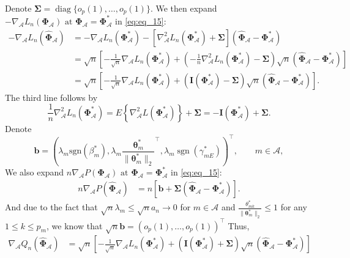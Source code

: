 \documentclass[a4paper,fleqn]{cas-sc}
\newcommand{\sgn}{\operatorname{sgn}}
\newcommand{\ddd}{,\ldots,}
\DeclareMathOperator{\diag}{diag} %
\newcommand{\A}{\mathcal{A}}
\begin{document}
{\normalsize{}Denote $\boldsymbol{\Sigma}=\diag\{o_{p}(1)\ddd o_{p}(1)\}.$
	We then expand $-\nabla_{\A}L_{n}\left(\boldsymbol{\Phi}_{\A}\right)\text{ at }\boldsymbol{\Phi}_{\A}=\boldsymbol{\Phi}_{\A}^{*}$
	in \eqref{eq:eq_15}: 
	\[
	\begin{aligned}-\nabla_{\A}L_{n}\left(\widehat{\boldsymbol{\Phi}}_{\A}\right) & =-\nabla_{\A}L_{n}\left(\boldsymbol{\Phi}_{\A}^{*}\right)-\left[\nabla_{\A}^{2}L_{n}\left(\boldsymbol{\Phi}_{\A}^{*}\right)+\boldsymbol{\Sigma}\right]\left(\widehat{\boldsymbol{\Phi}}_{\A}-\boldsymbol{\Phi}_{\A}^{*}\right)\\
	& =\sqrt{n}\left[-\frac{1}{\sqrt{n}}\nabla_{\A}L_{n}\left(\boldsymbol{\Phi}_{\A}^{*}\right)+\left(-\frac{1}{n}\nabla_{\A}^{2}L_{n}\left(\boldsymbol{\Phi}_{\A}^{*}\right)-\boldsymbol{\Sigma}\right)\sqrt{n}\left(\widehat{\boldsymbol{\Phi}}_{\A}-\boldsymbol{\Phi}_{\A}^{*}\right)\right]\\
	& =\sqrt{n}\left[-\frac{1}{\sqrt{n}}\nabla_{\A}L_{n}\left(\boldsymbol{\Phi}_{\A}^{*}\right)+\left(\mathbf{I}\left(\boldsymbol{\Phi}_{\A}^{*}\right)-\boldsymbol{\Sigma}\right)\sqrt{n}\left(\widehat{\boldsymbol{\Phi}}_{\A}-\boldsymbol{\Phi}_{\A}^{*}\right)\right].
	\end{aligned}
	\]
	The third line follows by 
	\[
	\frac{1}{n}\nabla_{\A}^{2}L_{n}\left(\boldsymbol{\boldsymbol{\Phi}}_{\A}^{*}\right)=E\left\{ \nabla_{\A}^{2}L\left(\boldsymbol{\boldsymbol{\Phi}}_{\A}^{*}\right)\right\} +\boldsymbol{\Sigma}=-\mathbf{I}\left(\boldsymbol{\boldsymbol{\Phi}}_{\A}^{*}\right)+\boldsymbol{\Sigma}.
	\]
	Denote 
	\[
	\mathbf{b}=(\lambda_{m}\textrm{sgn}\left(\beta_{m}^{*}\right),\lambda_{m}\frac{\boldsymbol{\theta}_{m}^{*}}{\|\boldsymbol{\theta}_{m}^{*}\|_{2}}^{\top},\lambda_{m}\sgn(\gamma_{mE}^{*}))^{\top},\qquad m\in\A,
	\]
	We also expand $n\nabla_{\A}P\left(\boldsymbol{\Phi}_{\A}\right)\text{ at }\boldsymbol{\Phi}_{\A}=\boldsymbol{\Phi}_{\A}^{*}$
	in \eqref{eq:eq_15}:
	\begin{align*}
	n\nabla_{\A}P\left(\widehat{\boldsymbol{\Phi}}_{\A}\right) & =n\left[\mathbf{b}+\boldsymbol{\Sigma}\left(\widehat{\boldsymbol{\Phi}}_{\A}-\boldsymbol{\Phi}_{\A}^{*}\right)\right].
	\end{align*}
	And due to the fact that $\sqrt{n}\lambda_{m}\leq\sqrt{n}a_{n}\rightarrow0$
	for $m\in\mathcal{A}$ and $\frac{\theta_{mk}^{*}}{\|\boldsymbol{\theta}_{m}^{*}\|_{2}}\leq1$
	for any $1\leq k\leq p_{m}$, we know that $\sqrt{n}\mathbf{b}=(o_{p}(1)\ddd o_{p}(1))^{\top}$
	Thus, 
	\begin{align*}
	\nabla_{\A}Q_{n}\left(\widehat{\boldsymbol{\Phi}}_{\A}\right) & =\sqrt{n}\left[-\frac{1}{\sqrt{n}}\nabla_{\A}L_{n}\left(\boldsymbol{\Phi}_{\A}^{*}\right)+\left(\mathbf{I}\left(\boldsymbol{\Phi}_{\A}^{*}\right)+\boldsymbol{\Sigma}\right)\sqrt{n}\left(\widehat{\boldsymbol{\Phi}}_{\A}-\boldsymbol{\Phi}_{\A}^{*}\right)\right]\\

\end{align*}}
\end{document}
